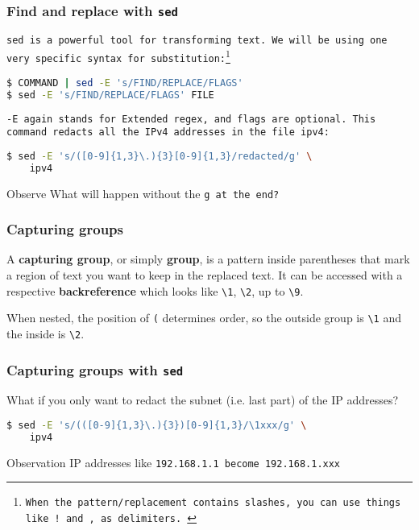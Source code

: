 \begin{frame}[fragile]
    \frametitle{Find and replace with \tt{sed}}
    \tt{sed} is a powerful tool for transforming text.
    We will be using one very specific syntax for substitution:\footnote{
        When the pattern/replacement contains slashes, you can use things like
        \tt{!} and \tt{,} as delimiters.
    }
    \begin{lstlisting}[language=bash]
$ COMMAND | sed -E 's/FIND/REPLACE/FLAGS'
$ sed -E 's/FIND/REPLACE/FLAGS' FILE
\end{lstlisting}
    \tt{-E} again stands for Extended regex, and flags are optional.
    This command redacts all the IPv4 addresses in the file \tt{ipv4}:
    \begin{lstlisting}[language=bash]
$ sed -E 's/([0-9]{1,3}\.){3}[0-9]{1,3}/redacted/g' \
    ipv4
\end{lstlisting}
    \begin{block}{Observe}
        What will happen without the \tt{g} at the end?
    \end{block}
\end{frame}

\begin{frame}[fragile]
    \frametitle{Capturing groups}
    A \textbf{capturing group}, or simply \textbf{group}, is a pattern inside
    parentheses that mark a region of text you want to keep in the replaced text.
    \newline \newline
    It can be accessed with a respective \textbf{backreference} which looks like
    \verb|\1|, \verb|\2|, up to \verb|\9|.

    When nested, the position of \verb|(| determines order, so the outside group is
    \verb|\1| and the inside is \verb|\2|.
\end{frame}

\begin{frame}[fragile]
    \frametitle{Capturing groups with \tt{sed}}
    What if you only want to redact the subnet (i.e. last part) of the IP addresses?
    \begin{lstlisting}[language=bash]
$ sed -E 's/(([0-9]{1,3}\.){3})[0-9]{1,3}/\1xxx/g' \
    ipv4
\end{lstlisting}
    \begin{block}{Observation}
        IP addresses like \tt{192.168.1.1} become \tt{192.168.1.xxx}
    \end{block}
\end{frame}

